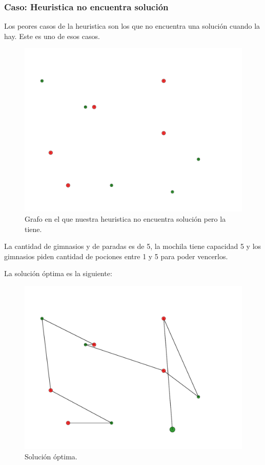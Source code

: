 \subsubsection{Caso: Heuristica no encuentra solución}

Los peores casos de la heuristica son los que no encuentra una solución cuando la hay. Este es uno de esos casos.

\begin{figure}[H]
  \begin{center}
    \includegraphics[scale=0.4]{imagenes/test5.pdf}
    \caption{Grafo en el que nuestra heuristica no encuentra solución pero la tiene.}
    \label{fig:ej2_caso4}
  \end{center}
\end{figure}

La cantidad de gimnasios y de paradas es de 5, la mochila tiene capacidad 5 y los gimnasios piden cantidad de pociones entre 1 y 5 para poder vencerlos.

La solución óptima es la siguiente:

\begin{figure}[H]
  \begin{center}
    \includegraphics[scale=0.4]{imagenes/test5-soltest5BT.pdf}
    \caption{Solución óptima.}
    \label{fig:ej2_caso4}
  \end{center}
\end{figure}


